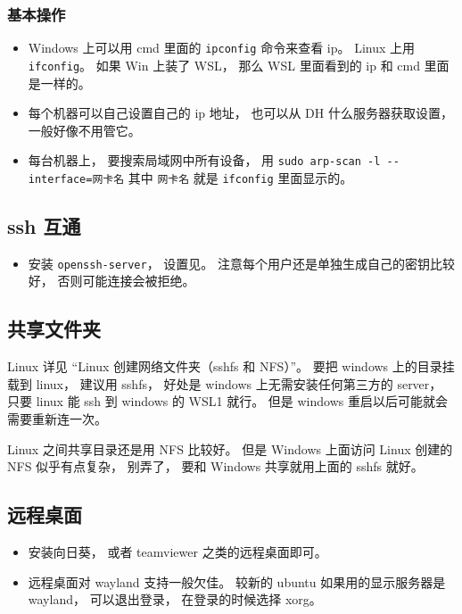 \subsubsection{基本操作}
\begin{itemize}
\item Windows 上可以用 cmd 里面的 \verb|ipconfig| 命令来查看 ip。 Linux 上用 \verb|ifconfig|。 如果 Win 上装了 WSL， 那么 WSL 里面看到的 ip 和 cmd 里面是一样的。
\item 每个机器可以自己设置自己的 ip 地址， 也可以从 DH 什么服务器获取设置， 一般好像不用管它。
\item 每台机器上， 要搜索局域网中所有设备， 用 \verb|sudo arp-scan -l --interface=网卡名| 其中 \verb|网卡名| 就是 \verb|ifconfig| 里面显示的。
\end{itemize}

\subsection{ssh 互通}
\begin{itemize}
\item 安装 \verb|openssh-server|， 设置见。 注意每个用户还是单独生成自己的密钥比较好， 否则可能连接会被拒绝。
\end{itemize}

\subsection{共享文件夹}
Linux 详见 “Linux 创建网络文件夹（sshfs 和 NFS）”。 要把 windows 上的目录挂载到 linux， 建议用 sshfs， 好处是 windows 上无需安装任何第三方的 server， 只要 linux 能 ssh 到 windows 的 WSL1 就行。 但是 windows 重启以后可能就会需要重新连一次。

Linux 之间共享目录还是用 NFS 比较好。 但是 Windows 上面访问 Linux 创建的 NFS 似乎有点复杂， 别弄了， 要和 Windows 共享就用上面的 sshfs 就好。

\subsection{远程桌面}
\begin{itemize}
\item 安装向日葵， 或者 teamviewer 之类的远程桌面即可。
\item 远程桌面对 wayland 支持一般欠佳。 较新的 ubuntu 如果用的显示服务器是 wayland， 可以退出登录， 在登录的时候选择 xorg。
\end{itemize}
